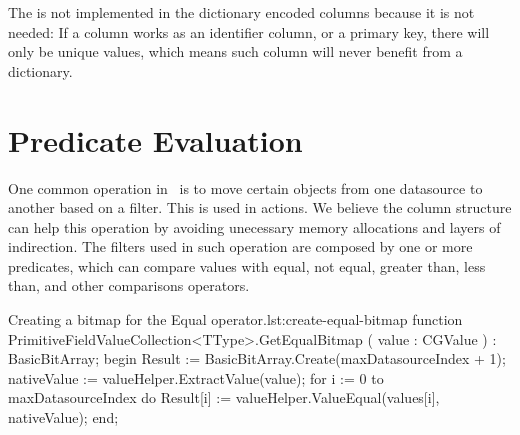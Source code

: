 The  is not implemented in the dictionary encoded columns because it is not needed: If a column works as an identifier column, or a primary key, there will only be unique values, which means such column will never benefit from a dictionary.

\section{Predicate Evaluation}
\label{sec:Predicate Evaluation}
One common operation in \gap~is to move certain objects from one datasource to another based on a filter. This is used in actions. We believe the column structure can help this operation by avoiding unecessary memory allocations and layers of indirection. The filters used in such operation are composed by one or more predicates, which can compare values with equal, not equal, greater than, less than, and other comparisons operators. 


\begin{delphicode}{Creating a bitmap for the Equal operator.}{lst:create-equal-bitmap}
function PrimitiveFieldValueCollection<TType>.GetEqualBitmap
( value : CGValue )
: BasicBitArray;
begin
  Result := BasicBitArray.Create(maxDatasourceIndex + 1);
  nativeValue := valueHelper.ExtractValue(value);
  for i := 0 to maxDatasourceIndex do
    Result[i] := valueHelper.ValueEqual(values[i], nativeValue);
end;
\end{delphicode}

